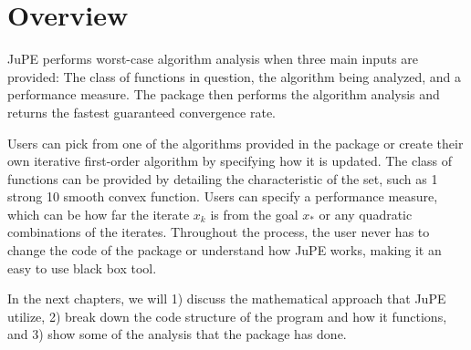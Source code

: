 \section{Overview}

JuPE performs worst-case algorithm analysis when three main inputs are provided: The class of functions in question, the algorithm being analyzed, and a performance measure. The package then performs the algorithm analysis and returns the fastest guaranteed convergence rate.

Users can pick from one of the algorithms provided in the package or create their own iterative first-order algorithm by specifying how it is updated. The class of functions can be provided by detailing the characteristic of the set, such as 1 strong 10 smooth convex function. Users can specify a performance measure, which can be how far the iterate \(x_k\) is from the goal \(x_*\) or any quadratic combinations of the iterates. Throughout the process, the user never has to change the code of the package or understand how JuPE works, making it an easy to use black box tool.

In the next chapters, we will 1) discuss the mathematical approach that JuPE utilize, 2) break down the code structure of the program and how it functions, and 3) show some of the analysis that the package has done.